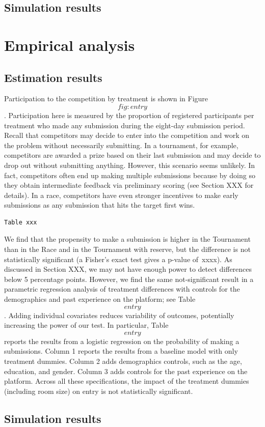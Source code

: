 \documentclass[12pt,]{article}
\theoremstyle{plain} %
\begin{document}
\subsection{Simulation results}\label{simulation-results}

\section{Empirical analysis}\label{empirical-analysis}

\subsection{Estimation results}\label{estimation-results-1}

Participation to the competition by treatment is shown in Figure
\[fig:entry\]. Participation here is measured by the proportion of
registered participants per treatment who made any submission during the
eight-day submission period. Recall that competitors may decide to enter
into the competition and work on the problem without necessarily
submitting. In a tournament, for example, competitors are awarded a
prize based on their last submission and may decide to drop out without
submitting anything. However, this scenario seems unlikely. In fact,
competitors often end up making multiple submissions because by doing so
they obtain intermediate feedback via preliminary scoring (see Section
XXX for details). In a race, competitors have even stronger incentives
to make early submissions as any submission that hits the target first
wins.

\begin{verbatim}
Table xxx
\end{verbatim}

We find that the propensity to make a submission is higher in the
Tournament than in the Race and in the Tournament with reserve, but the
difference is not statistically significant (a Fisher's exact test gives
a p-value of~xxxx). As discussed in Section XXX, we may not have enough
power to detect differences below 5 percentage points. However, we find
the same not-significant result in a parametric regression analysis of
treatment differences with controls for the demographics and past
experience on the platform; see Table \[entry\]. Adding individual
covariates reduces variability of outcomes, potentially increasing the
power of our test. In particular, Table \[entry\] reports the results
from a logistic regression on the probability of making a submissions.
Column 1 reports the results from a baseline model with only treatment
dummies. Column 2 adds demographics controls, such as the age,
education, and gender. Column 3 adds controls for the past experience on
the platform. Across all these specifications, the impact of the
treatment dummies (including room size) on entry is not statistically
significant.

\subsection{Simulation results}\label{simulation-results-1}

\renewcommand\refname{References}

\end{document}
